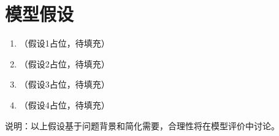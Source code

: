 
\section{模型假设}\label{sec:assumptions}

\begin{enumerate}
    \item （假设1占位，待填充）
    \item （假设2占位，待填充）
    \item （假设3占位，待填充）
    \item （假设4占位，待填充）
\end{enumerate}

\noindent 说明：以上假设基于问题背景和简化需要，合理性将在模型评价中讨论。
